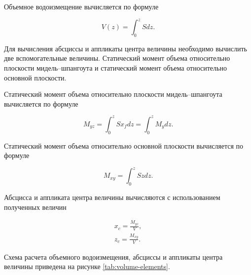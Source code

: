 Объемное водоизмещение вычисляется по формуле

\begin{equation}
    V(z) = \int_0^z S dz.
\end{equation}

Для вычисления абсциссы и аппликаты центра величины необходимо вычислить две вспомогательные величины.
Статический момент объема относительно плоскости мидель–шпангоута и статический момент объема относительно основной плоскости.

Статический момент объема относительно плоскости мидель–шпангоута вычисляется по формуле

\begin{equation}
    M_{yz} = \int_0^z S x_f dz = \int_0^z M_y dz.
\end{equation}

Статический момент объема относительно основной плоскости вычисляется по формуле

\begin{equation}
    M_{xy} = \int_0^z S z dz.
\end{equation}

Абсцисса и аппликата центра величины вычисляются с использованием полученных величин

\begin{equation}
    \begin{split}
    x_c = \frac{M_{yz}}{V}, \\
    z_c = \frac{M_{xy}}{V}.
    \end{split}
\end{equation}

Схема расчета объемного водоизмещения, абсциссы и аппликаты центра величины приведена на рисунке \ref{tab:volume-elements}.

